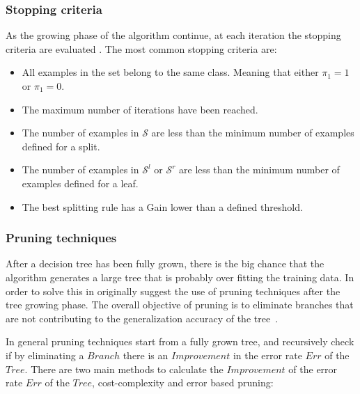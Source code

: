\subsubsection{Stopping criteria}
As the growing phase of the algorithm continue, at each iteration the stopping criteria are 
evaluated \citep{Rokach2010}. The most common stopping criteria are:
 \begin{itemize}
   \item All examples in the set belong to the same class. Meaning that either $\pi_1=1$ or 
    $\pi_1=0$.

  \item The maximum number of iterations have been reached.
  
  \item The number of examples in $\mathcal{S}$ are less than the minimum number of examples 
defined for a split.
  
  \item The number of examples in $\mathcal{S}^l$ or $\mathcal{S}^r$ are less than the minimum 
number of examples defined for a leaf.
  
  \item The best splitting rule has a Gain lower than a defined threshold.
\end{itemize}


\subsubsection{Pruning techniques}
After a decision tree has been fully grown, there is the big chance that  the algorithm generates a 
large tree that is probably over fitting the  training data. In order to solve this in 
\citep{Breiman1984a} originally suggest the use of pruning techniques after the tree growing phase.
The overall objective of pruning is to eliminate branches that are not contributing
to the generalization accuracy of the \mbox{tree \citep{Rokach2010}.}
 
In general pruning techniques start from a fully grown tree, and recursively check if by 
eliminating 
a $Branch$ there is an $Improvement$ in the error rate $Err$ of the $Tree$.  There are two 
main 
methods to calculate the $Improvement$ of the error rate $Err$ of the $Tree$, cost-complexity 
and  error based pruning:
  
